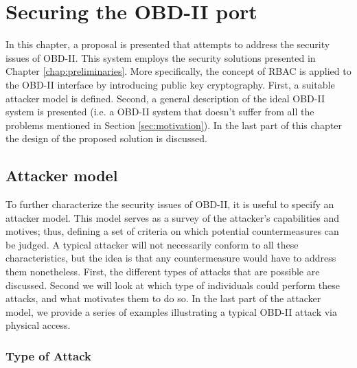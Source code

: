 \chapter{Securing the OBD-II port}
\label{chap:solution}

In this chapter, a proposal is presented that attempts to address the security issues of OBD-II. This system employs the security solutions presented in Chapter \ref{chap:preliminaries}. More specifically, the concept of RBAC is applied to the OBD-II interface by introducing public key cryptography. First, a suitable attacker model is defined. Second, a general description of the ideal OBD-II system is presented (i.e. a OBD-II system that doesn't suffer from all the problems mentioned in Section \ref{sec:motivation}). In the last part of this chapter the design of the proposed solution is discussed.

\section{Attacker model} 
\label{sec:attacker_model}

To further characterize the security issues of OBD-II, it is useful to specify an attacker model. This model serves as a survey of the attacker's capabilities and motives; thus, defining a set of criteria on which potential countermeasures can be judged. A typical attacker will not necessarily conform to all these characteristics, but the idea is that any countermeasure would have to address them nonetheless. First, the different types of attacks that are possible are discussed. Second we will look at which type of individuals could perform these attacks, and what motivates them to do so. In the last part of the attacker model, we provide a series of examples illustrating a typical OBD-II attack via physical access.

\subsection{Type of Attack}  
\label{subsec:attack_type}

